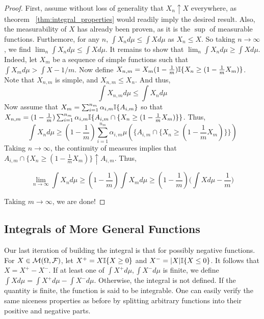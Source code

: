     \begin{proof}
        
        First, assume without loss of generality that $X_n \uparrow X$ everywhere, as theorem ~\ref{thm:integral_properties} would readily 
        imply the desired result. Also, the measurability of $X$ has already been proven, as it is the $\sup$ of measurable 
        functions. Furthemore, for any $n$, $\int X_n d\mu \leq \int X d\mu$ as $X_n \leq X$. So taking 
        $n \to \infty$, we find $\lim_n \int X_n d\mu \leq \int X d\mu$. It remains to show that 
        $\lim_n \int X_n d\mu \geq \int X d\mu$. Indeed, let $X_m$ be a sequence of simple 
        functions such that $\int X_m d\mu > \int X - 1/m$. Now define $X_{n,m} = X_m (1-\frac{1}{m})\mathbb I\{X_n \geq (1-\frac{1}{m}X_m)\}$.
        Note that $X_{n,m}$ is simple, and $X_{n,m} \leq X_n$. And thus, 
        \[ \int X_{n,m} d\mu \leq \int X_n d\mu \]
        Now assume that $X_m = \sum_{i=1}^{n_m} \alpha_{i,m} \mathbb I\{A_{i,m}\}$ so that $X_{n,m} = (1-\frac{1}{m}) \sum_{i=1}^{n_m} \alpha_{i,m} \mathbb I\{A_{i,m} \cap \{X_n \geq (1-\frac{1}{m}X_m) \} \}$.
        Thus, 
        \[ \int X_n d\mu \geq (1-\frac{1}{m}) \sum_{i=1}^{n_m}\alpha_{i,m} \mu(\{A_{i,m} \cap \{X_n \geq (1-\frac{1}{m}X_m) \} \}) \] 
        Taking $n \to \infty$, the continuity of measures implies that $A_{i,m} \cap \{X_n \geq (1-\frac{1}{m}X_m)\} \uparrow A_{i,m}$. Thus, 

        \[ \lim_{n \to \infty} \int X_n d\mu \geq (1-\frac{1}{m}) \int X_m d\mu \geq (1 - \frac{1}{m}) \bigg( \int X d\mu - \frac{1}{m} \bigg)\] 

        Taking $m \to \infty$, we are done!

    \end{proof}

    \subsection{Integrals of More General Functions}

    Our last iteration of building the integral is that for possibly negative functions. 
    For $X \in \mathcal M(\Omega, \mathcal F)$, let $X^+ = X\mathbb I\{X \geq 0\}$ and $X^- = |X|\mathbb I\{X \leq 0\}$. It follows that 
    $X = X^+ - X^-$. If at least one of $\int X^+d\mu, \int X^- d\mu$ is finite, we define $\int X d\mu
     = \int X^+ d\mu - \int X^- d\mu$. Otherwise, the integral is not defined. If the quantity is finite, the 
     function is said to be integrable.
      One can easily verify the 
    same niceness properties as before by splitting arbitrary functions into their positive and negative parts. 

